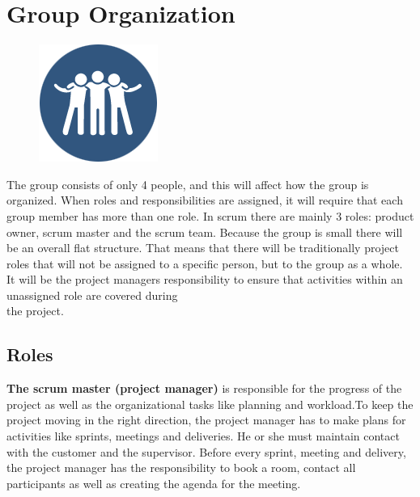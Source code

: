 \clearpage
\section{Group Organization}

\begin{figure}
  \begin{center}
  \includegraphics[scale=0.72]{pictures/team.png}
  \end{center}
\end{figure}

The group consists of only 4 people, and this will affect how the group is organized. When roles and responsibilities are assigned, it will require that each group member has more than one role. In scrum there are mainly 3 roles: product owner, scrum master and the scrum team. Because the group is small there will be an overall flat structure. That means that
there will be traditionally project roles that will not be assigned to a specific person, but to the group as a whole. It will be the project managers responsibility to ensure that activities within an unassigned role are covered during \\ the project.

\subsection{Roles}

{\bf The scrum master (project manager)} is responsible for the progress of the project as well as the organizational tasks like planning and workload.To keep the project moving in the right direction, the project manager has to make plans for activities like sprints, meetings and deliveries. He or she must maintain contact with the customer and the supervisor.
Before every sprint, meeting and delivery, the project manager has the responsibility to book a room, contact all
participants as well as creating the agenda for the meeting. \\

